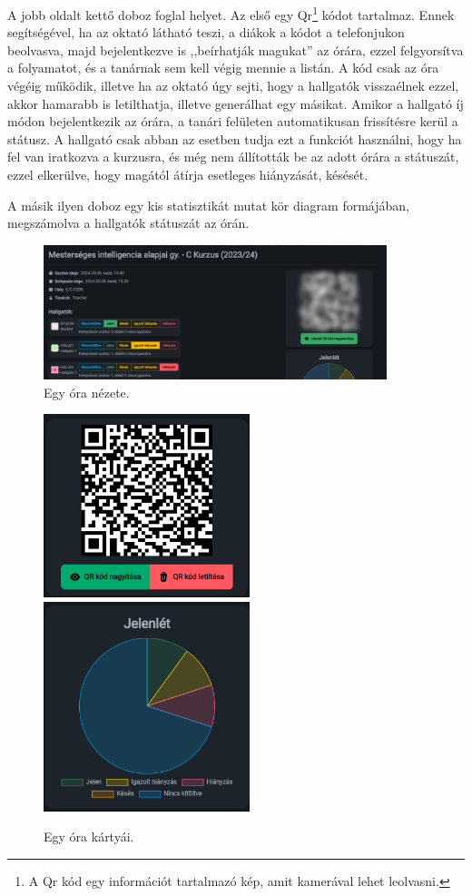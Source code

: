 \documentclass[
]{thesis-ekf}
\theoremstyle{definition}
\theoremstyle{remark}
\begin{document}
A jobb oldalt kettő doboz foglal helyet. Az első egy Qr\footnote{A Qr kód egy információt tartalmazó kép,  amit kamerával lehet leolvasni.\cite{QR}} kódot tartalmaz. Ennek segítségével, ha az oktató látható teszi, a diákok a kódot a telefonjukon beolvasva, majd bejelentkezve is ,,beírhatják magukat'' az órára, ezzel felgyorsítva a folyamatot, és a tanárnak sem kell végig mennie a listán. A kód csak az óra végéig működik, illetve ha az oktató úgy sejti, hogy a hallgatók visszaélnek ezzel, akkor hamarabb is letilthatja, illetve generálhat egy másikat. Amikor a hallgató íj módon bejelentkezik az órára, a tanári felületen automatikusan frissítésre kerül a státusz. A hallgató csak abban az esetben tudja ezt a funkciót használni, hogy ha fel van iratkozva a kurzusra, és még nem állították be az adott órára a státuszát, ezzel elkerülve, hogy magától átírja esetleges hiányzását, késését.

A másik ilyen doboz egy kis statisztikát mutat kör diagram formájában, megszámolva a hallgatók státuszát az órán.

\begin{figure}[ht!]
	\centering
	\includegraphics[width=10cm]{../pictures/screenshots/class_1.png}
	\caption{Egy óra nézete.}
	\label{class}
\end{figure}

\begin{figure}[ht!]
	\centering
	\includegraphics[width=6cm]{../pictures/screenshots/class_2.png}
	\includegraphics[width=6cm]{../pictures/screenshots/class_3.png}
	\caption{Egy óra kártyái.}
	\label{class2}
\end{figure}
\end{document}
